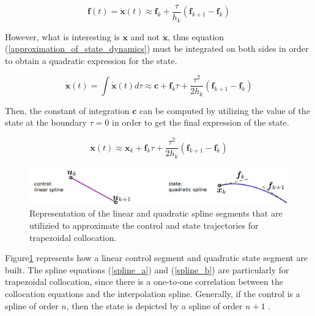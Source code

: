 \documentclass{thesisreport}
\begin{document}
 
 \begin{equation}\label{approximation_of_state_dynamics}
 	\bm{f}(t) = \dot{\bm{x}}(t) \approx \bm{f}_k + \frac{\tau}{h_k}(\bm{f}_{k+1}-\bm{f}_k)
 \end{equation}
 
 However, what is interesting is $\bm{x}$ and not $\dot{\bm{x}}$, thus equation (\ref{approximation_of_state_dynamics}) must be integrated on both sides in order to obtain a quadratic expression for the state.
 
 \begin{equation}
 	\bm{x}(t) = \int \dot{\bm{x}}(t) d \tau \approx \bm{c} + \bm{f}_k \tau + \frac{\tau^2}{2 h_k} (\bm{f}_{k+1}-\bm{f}_k)
 \end{equation}
 
 
Then, the constant of integration $\bm{c}$ can be computed by utilizing the value of the state at the boundary $\tau = 0$  in order to get the final expression of the state.

 \begin{equation}\label{spline_b}
 	\bm{x}(t) \approx \bm{x}_k + \bm{f}_k \tau + \frac{\tau^2}{2 h_k} (\bm{f}_{k+1}-\bm{f}_k)
 \end{equation} 

\newpage 
 
 \begin{figure}[h]
 \centering
 \includegraphics[width=\textwidth]{Images/Trajectory/Trapezoid_Rule}
 \caption{Representation of the linear and quadratic spline segments that are utilizied to approximate the control and state trajectories for trapezoidal collocation.}
 \label{trapezoid_collocation_state_control_fig}
 \end{figure}
 
 
 
\noindent Figure\ref{trapezoid_collocation_state_control_fig} represents how a linear control segment and quadratic state segment are built. The spline equations (\ref{spline_a}) and (\ref{spline_b}) are particularly for trapezoidal collocation, since there is a one-to-one correlation between the collocation equations and the interpolation spline. Generally, if the control is a spline of order $n$, then the state is depicted by a spline of order $n+1$ \cite{Betts2010}.
 
\end{document}
